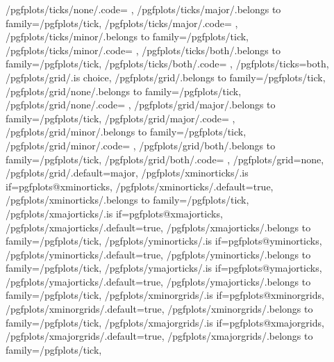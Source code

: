 {	/pgfplots/ticks/none/.code={%
		\pgfplots@xminorticksfalse
		\pgfplots@yminorticksfalse
		\pgfplots@xmajorticksfalse
		\pgfplots@ymajorticksfalse
	},
	/pgfplots/ticks/major/.belongs to family=/pgfplots/tick,
	/pgfplots/ticks/major/.code={%
		\pgfplots@xminorticksfalse
		\pgfplots@yminorticksfalse
		\pgfplots@xmajortickstrue
		\pgfplots@ymajortickstrue
	},
	/pgfplots/ticks/minor/.belongs to family=/pgfplots/tick,
	/pgfplots/ticks/minor/.code={%
		\pgfplots@xminortickstrue
		\pgfplots@yminortickstrue
		\pgfplots@xmajorticksfalse
		\pgfplots@ymajorticksfalse
	},
	/pgfplots/ticks/both/.belongs to family=/pgfplots/tick,
	/pgfplots/ticks/both/.code={%
		\pgfplots@xminortickstrue
		\pgfplots@yminortickstrue
		\pgfplots@xmajortickstrue
		\pgfplots@ymajortickstrue
	},
	/pgfplots/ticks=both,
	/pgfplots/grid/.is choice,
	/pgfplots/grid/.belongs to family=/pgfplots/tick,
	/pgfplots/grid/none/.belongs to family=/pgfplots/tick,
	/pgfplots/grid/none/.code={%
		\pgfplots@xminorgridsfalse
		\pgfplots@yminorgridsfalse
		\pgfplots@xmajorgridsfalse
		\pgfplots@ymajorgridsfalse
	},
	/pgfplots/grid/major/.belongs to family=/pgfplots/tick,
	/pgfplots/grid/major/.code={%
		\pgfplots@xminorgridsfalse
		\pgfplots@yminorgridsfalse
		\pgfplots@xmajorgridstrue
		\pgfplots@ymajorgridstrue
	},
	/pgfplots/grid/minor/.belongs to family=/pgfplots/tick,
	/pgfplots/grid/minor/.code={%
		\pgfplots@xminorgridstrue
		\pgfplots@yminorgridstrue
		\pgfplots@xmajorgridsfalse
		\pgfplots@ymajorgridsfalse
	},
	/pgfplots/grid/both/.belongs to family=/pgfplots/tick,
	/pgfplots/grid/both/.code={%
		\pgfplots@xminorgridstrue
		\pgfplots@yminorgridstrue
		\pgfplots@xmajorgridstrue
		\pgfplots@ymajorgridstrue
	},
	/pgfplots/grid=none,
	/pgfplots/grid/.default=major,
	/pgfplots/xminorticks/.is if=pgfplots@xminorticks,
	/pgfplots/xminorticks/.default=true,
	/pgfplots/xminorticks/.belongs to family=/pgfplots/tick,
	/pgfplots/xmajorticks/.is if=pgfplots@xmajorticks,
	/pgfplots/xmajorticks/.default=true,
	/pgfplots/xmajorticks/.belongs to family=/pgfplots/tick,
	/pgfplots/yminorticks/.is if=pgfplots@yminorticks,
	/pgfplots/yminorticks/.default=true,
	/pgfplots/yminorticks/.belongs to family=/pgfplots/tick,
	/pgfplots/ymajorticks/.is if=pgfplots@ymajorticks,
	/pgfplots/ymajorticks/.default=true,
	/pgfplots/ymajorticks/.belongs to family=/pgfplots/tick,
	/pgfplots/xminorgrids/.is if=pgfplots@xminorgrids,
	/pgfplots/xminorgrids/.default=true,
	/pgfplots/xminorgrids/.belongs to family=/pgfplots/tick,
	/pgfplots/xmajorgrids/.is if=pgfplots@xmajorgrids,
	/pgfplots/xmajorgrids/.default=true,
	/pgfplots/xmajorgrids/.belongs to family=/pgfplots/tick,
}
